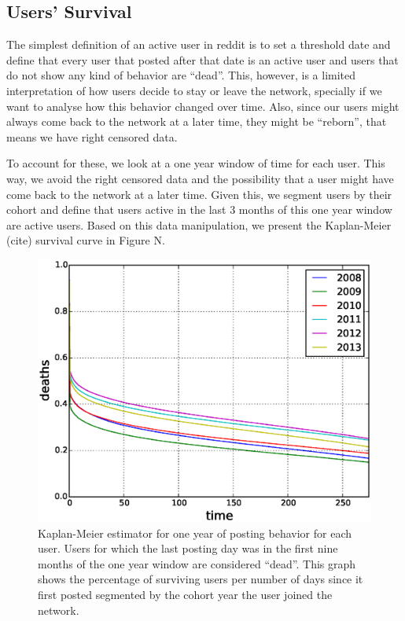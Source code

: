 \subsection{Users' Survival}

The simplest definition of an active user in reddit is to set a threshold date and define that every user that posted after that date is an active user and users that do not show any kind of behavior are ``dead''. This, however, is a limited interpretation of how users decide to stay or leave the network, specially if we want to analyse how this behavior changed over time. Also, since our users might always come back to the network at a later time, they might be ``reborn'', that means we have right censored data.

To account for these, we look at a one year window of time for each user. This way, we avoid the right censored data and the possibility that a user might have come back to the network at a later time. Given this, we segment users by their cohort and define that users active in the last 3 months of this one year window are active users. Based on this data manipulation, we present the Kaplan-Meier (cite) survival curve in Figure N.

\begin{figure}[!tb]
\centering
\includegraphics[scale=0.4]{./images/kaplan_meier_users.eps}
\caption{Kaplan-Meier estimator for one year of posting behavior for each user. Users for which the last posting day was in the first nine months of the one year window are considered ``dead''. This graph shows the percentage of surviving users per number of days since it first posted segmented by the cohort year the user joined the network.}
\label{fig:kaplan_meier_users}
\end{figure}

